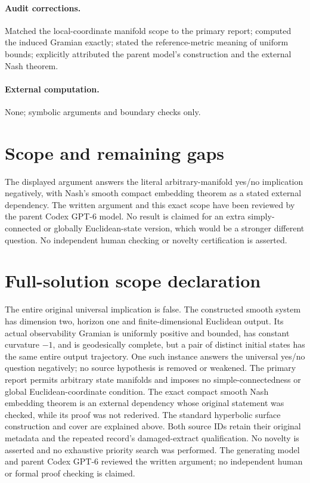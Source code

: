 \documentclass[11pt]{article}
\begin{document}
\paragraph{Audit corrections.} Matched the local-coordinate manifold scope to the primary report; computed the induced Gramian exactly; stated the reference-metric meaning of uniform bounds; explicitly attributed the parent model's construction and the external Nash theorem.
\paragraph{External computation.} None; symbolic arguments and boundary checks only.
\section{Scope and remaining gaps}
The displayed argument answers the literal arbitrary-manifold yes/no implication negatively, with Nash's smooth compact embedding theorem as a stated external dependency. The written argument and this exact scope have been reviewed by the parent Codex GPT-6 model. No result is claimed for an extra simply-connected or globally Euclidean-state version, which would be a stronger different question. No independent human checking or novelty certification is asserted.
\section{Full-solution scope declaration}
The entire original universal implication is false. The constructed smooth system
has dimension two, horizon one and finite-dimensional Euclidean output. Its actual
observability Gramian is uniformly positive and bounded, has constant curvature
$-1$, and is geodesically complete, but a pair of distinct initial states has the
same entire output trajectory. One such instance answers the universal yes/no
question negatively; no source hypothesis is removed or weakened. The primary
report permits arbitrary state manifolds and imposes no simple-connectedness or
global Euclidean-coordinate condition. The exact compact smooth Nash embedding
theorem is an external dependency whose original statement was checked, while its
proof was not rederived. The standard hyperbolic surface construction and cover
are explained above. Both source IDs retain their original metadata and the
repeated record's damaged-extract qualification. No novelty is asserted and no
exhaustive priority search was performed. The generating model and parent Codex
GPT-6 reviewed the written argument; no independent human or formal proof checking
is claimed.
\end{document}
